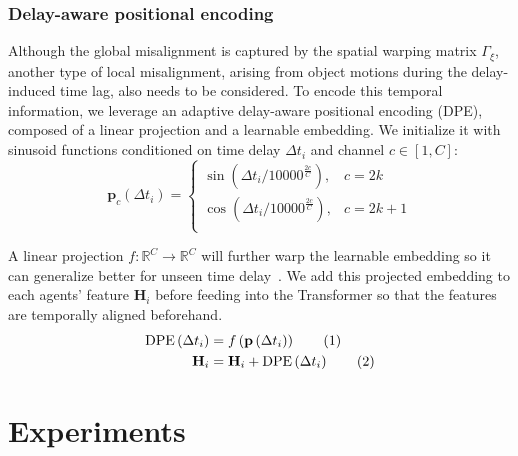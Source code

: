 \documentclass[runningheads]{llncs}
\newcommand\numberthis{\addtocounter{equation}{1}\tag{\theequation}}
\begin{document}
\vspace{-3mm}
\subsubsection{Delay-aware positional encoding}
Although the global misalignment is captured by the spatial warping matrix $\Gamma_{\xi}$, another type of local misalignment, arising from object motions during the delay-induced time lag, also needs to be considered.
To encode this temporal information, we leverage an adaptive delay-aware positional encoding (DPE), composed of a linear projection and a learnable embedding. We initialize it with sinusoid functions conditioned on time delay $\Delta t_i$ and channel $c\in[1,C]$: 
\begin{equation}
    \mathbf{p}_c\left(\Delta t_{i}\right)=\begin{cases} 
      \sin\left(\Delta t_{i}/10000^{\frac{2c}{C}}\right),&c=2k\\
      \cos\left(\Delta t_{i}/10000^{\frac{2c}{C}}\right),&c=2k+1\\
   \end{cases}
\end{equation}

A linear projection $f:\mathbb{R}^C\rightarrow\mathbb{R}^C$ will further warp the learnable embedding so it can generalize better for unseen time delay~\cite{hu2020heterogeneous}. We add this projected embedding to each agents' feature $\mathbf{H}_i$ before feeding into the Transformer so that the features are temporally aligned beforehand. 
\begin{align*}
    \text{DPE}\left(\Delta t_{i}\right)&=f\left(\mathbf{p}\left(\Delta t_{i}\right)\right)\numberthis \label{9}\\
    \mathbf{H}_i&= \mathbf{H}_i+\text{DPE}\left(\Delta t_{i}\right)\numberthis \label{10}
\end{align*}
\section{Experiments}
\end{document}
